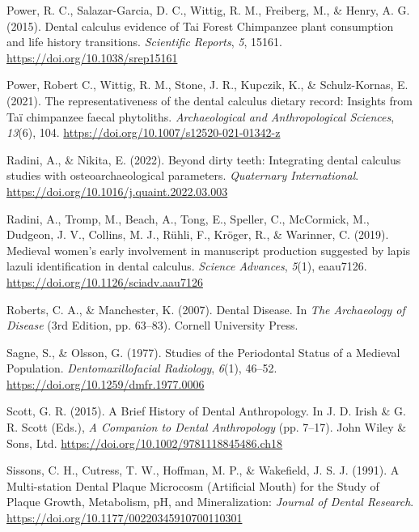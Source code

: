 \documentclass[
  letterpaper,
]{book}
\newlength{\cslhangindent}
\newlength{\cslentryspacingunit} %
\newenvironment{CSLReferences}[2] %
 {%
  \setlength{\parindent}{0pt}
  \ifodd #1
  \let\oldpar\par
  \def\par{\hangindent=\cslhangindent\oldpar}
  \fi
  \setlength{\parskip}{#2\cslentryspacingunit}
 }%
 {}
\begin{document}
\begin{CSLReferences}{1}{0}
\leavevmode{}%
Power, R. C., Salazar-Garcia, D. C., Wittig, R. M., Freiberg, M., \&
Henry, A. G. (2015). Dental calculus evidence of {Tai Forest Chimpanzee}
plant consumption and life history transitions. \emph{Scientific
Reports}, \emph{5}, 15161. \url{https://doi.org/10.1038/srep15161}

\leavevmode{}%
Power, Robert C., Wittig, R. M., Stone, J. R., Kupczik, K., \&
Schulz-Kornas, E. (2021). The representativeness of the dental calculus
dietary record: Insights from {Taï} chimpanzee faecal phytoliths.
\emph{Archaeological and Anthropological Sciences}, \emph{13}(6), 104.
\url{https://doi.org/10.1007/s12520-021-01342-z}

\leavevmode{}%
Radini, A., \& Nikita, E. (2022). Beyond dirty teeth: {Integrating}
dental calculus studies with osteoarchaeological parameters.
\emph{Quaternary International}.
\url{https://doi.org/10.1016/j.quaint.2022.03.003}

\leavevmode{}%
Radini, A., Tromp, M., Beach, A., Tong, E., Speller, C., McCormick, M.,
Dudgeon, J. V., Collins, M. J., Rühli, F., Kröger, R., \& Warinner, C.
(2019). Medieval women's early involvement in manuscript production
suggested by lapis lazuli identification in dental calculus.
\emph{Science Advances}, \emph{5}(1), eaau7126.
\url{https://doi.org/10.1126/sciadv.aau7126}

\leavevmode{}%
Roberts, C. A., \& Manchester, K. (2007). Dental {Disease}. In \emph{The
{Archaeology} of {Disease}} (3rd Edition, pp. 63--83). {Cornell
University Press}.

\leavevmode{}%
Sagne, S., \& Olsson, G. (1977). Studies of the {Periodontal Status} of
a {Medieval Population}. \emph{Dentomaxillofacial Radiology},
\emph{6}(1), 46--52. \url{https://doi.org/10.1259/dmfr.1977.0006}

\leavevmode{}%
Scott, G. R. (2015). A {Brief History} of {Dental Anthropology}. In J.
D. Irish \& G. R. Scott (Eds.), \emph{A {Companion} to {Dental
Anthropology}} (pp. 7--17). {John Wiley \& Sons, Ltd}.
\url{https://doi.org/10.1002/9781118845486.ch18}

\leavevmode{}%
Sissons, C. H., Cutress, T. W., Hoffman, M. P., \& Wakefield, J. S. J.
(1991). A {Multi-station Dental Plaque Microcosm} ({Artificial Mouth})
for the {Study} of {Plaque Growth}, {Metabolism}, {pH}, and
{Mineralization}: \emph{Journal of Dental Research}.
\url{https://doi.org/10.1177/00220345910700110301}


\end{CSLReferences}
\end{document}
